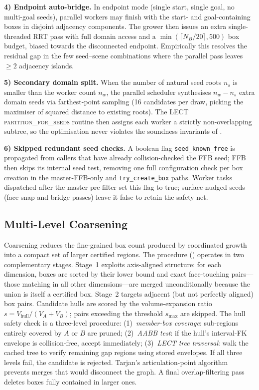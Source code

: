 \documentclass[journal]{IEEEtran}
\begin{document}
\textbf{4) Endpoint auto-bridge.}
In endpoint mode (single start, single goal, no multi-goal seeds),
parallel workers may finish with the start- and goal-containing boxes
in disjoint adjacency components. The grower then issues an
extra single-threaded RRT pass with full domain access and a
$\min(\lceil N_B/20\rceil,500)$ box budget, biased towards the
disconnected endpoint. Empirically this resolves the residual gap in
the few seed--scene combinations where the parallel pass leaves
$\ge 2$ adjacency islands.

\textbf{5) Secondary domain split.}
When the number of natural seed roots $n_s$ is smaller than the
worker count $n_w$, the parallel scheduler synthesises
$n_w-n_s$ extra domain seeds via farthest-point sampling
(16 candidates per draw, picking the maximiser of squared distance to
existing roots). The LECT \textsc{partition\_for\_seeds} routine
then assigns each worker a strictly non-overlapping subtree, so the
optimisation never violates the soundness invariants of
.

\textbf{6) Skipped redundant seed checks.}
A boolean flag \texttt{seed\_known\_free} is propagated from callers
that have already collision-checked the FFB seed; FFB then skips its
internal seed test, removing one full configuration check per box
creation in the master-FFB-only and \texttt{try\_create\_box} paths.
Worker tasks dispatched after the master pre-filter set this flag to
true; surface-nudged seeds (face-snap and bridge passes) leave it
false to retain the safety net.

\subsection{Multi-Level Coarsening}

Coarsening reduces the fine-grained box count produced by coordinated
growth into a compact set of larger certified regions.
The procedure () operates in two complementary stages.
Stage~1 exploits axis-aligned structure: for each dimension, boxes are
sorted by their lower bound and exact face-touching pairs---those
matching in all other dimensions---are merged unconditionally because
the union is itself a certified box.
Stage~2 targets adjacent (but not perfectly aligned) box pairs.
Candidate hulls are scored by the volume-expansion ratio
$s = V_{\text{hull}}/(V_A{+}V_B)$; pairs exceeding the threshold
$s_{\max}$ are skipped.
The hull safety check is a three-level procedure:
(1)~\emph{member-box coverage}: sub-regions entirely covered by $A$ or
$B$ are pruned;
(2)~\emph{AABB test}: if the hull's interval-FK envelope is
collision-free, accept immediately;
(3)~\emph{LECT tree traversal}: walk the cached tree to verify
remaining gap regions using stored envelopes.
If all three levels fail, the candidate is rejected.
Tarjan's articulation-point algorithm prevents merges that would
disconnect the graph.
A final overlap-filtering pass deletes boxes fully contained in
larger ones.
\end{document}

